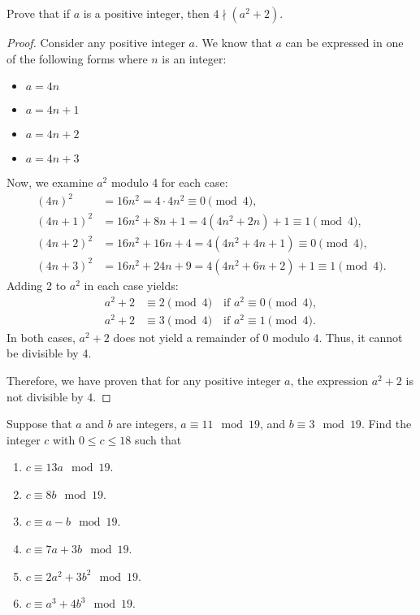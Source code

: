     \begin{exercise}
        Prove that if $a$ is a positive integer, then $4\nmid (a^2+2)$.
    \end{exercise}
    \begin{proof}
        Consider any positive integer $a$. We know that $a$ can be expressed in one of the following forms where $n$ is an integer:
        \begin{itemize}
            \item $a = 4n$
            \item $a = 4n + 1$
            \item $a = 4n + 2$
            \item $a = 4n + 3$
        \end{itemize}
        Now, we examine $a^2$ modulo 4 for each case:
        \begin{align*}
            (4n)^2 &= 16n^2 = 4 \cdot 4n^2 \equiv 0 \pmod{4}, \\
            (4n + 1)^2 &= 16n^2 + 8n + 1 = 4(4n^2 + 2n) + 1 \equiv 1 \pmod{4}, \\
            (4n + 2)^2 &= 16n^2 + 16n + 4 = 4(4n^2 + 4n + 1) \equiv 0 \pmod{4}, \\
            (4n + 3)^2 &= 16n^2 + 24n + 9 = 4(4n^2 + 6n + 2) + 1 \equiv 1 \pmod{4}.
        \end{align*}
        Adding 2 to $a^2$ in each case yields:
        \begin{align*}
            a^2 + 2 &\equiv 2 \pmod{4} \quad \text{if } a^2 \equiv 0 \pmod{4}, \\
            a^2 + 2 &\equiv 3 \pmod{4} \quad \text{if } a^2 \equiv 1 \pmod{4}.
        \end{align*}
        In both cases, $a^2 + 2$ does not yield a remainder of $0$ modulo $4$. Thus, it cannot be divisible by $4$.

        Therefore, we have proven that for any positive integer $a$, the expression $a^2 + 2$ is not divisible by $4$.
    \end{proof}

    \begin{exercise}
        Suppose that \( a \) and \( b \) are integers, \( a \equiv 11 \mod{19} \), and \( b \equiv 3 \mod{19} \). 
        Find the integer \( c \) with \( 0 \leq c \leq 18 \) such that
        \begin{enumerate}
            \item \( c \equiv 13a \mod{19} \).
            \item \( c \equiv 8b \mod{19} \).
            \item \( c \equiv a - b \mod{19} \).
            \item \( c \equiv 7a + 3b \mod{19} \).
            \item \( c \equiv 2a^2 + 3b^2 \mod{19} \).
            \item \( c \equiv a^3 + 4b^3 \mod{19} \).
        \end{enumerate}
    \end{exercise}

